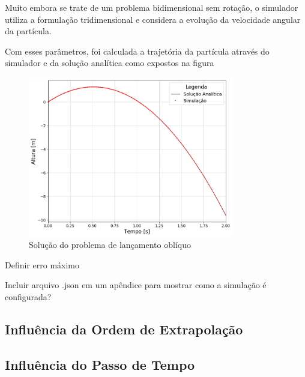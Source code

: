 Muito embora se trate de um problema bidimensional sem rotação, o simulador utiliza a formulação tridimensional e considera a evolução da velocidade angular da partícula.

Com esses parâmetros, foi calculada a trajetória da partícula através do simulador e da solução analítica como expostos na figura 

\begin{figure}[h]
	\caption{Solução do problema de lançamento oblíquo}
	\begin{center}
		\includegraphics[width=0.8\textwidth]{images/falling_sphere/y_position.png}
	\end{center}
	\label{fig:falling_sphere}
\end{figure}

\alert{Definir erro máximo}

\alert{Incluir arquivo .json em um apêndice para mostrar como a simulação é configurada?}

\subsection{Influência da Ordem de Extrapolação}

\subsection{Influência do Passo de Tempo}